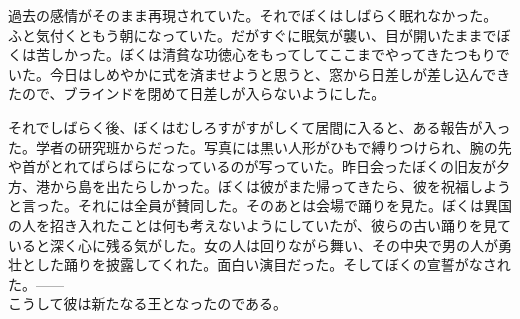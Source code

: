 \documentclass[b5j,twoside,twocolumn]{utarticle}
\begin{document}
過去の感情がそのまま再現されていた。それでぼくはしばらく眠れなかった。\\



ふと気付くともう朝になっていた。だがすぐに眠気が襲い、目が開いたままでぼくは苦しかった。ぼくは清貧な功徳心をもってしてここまでやってきたつもりでいた。今日はしめやかに式を済ませようと思うと、窓から日差しが差し込んできたので、ブラインドを閉めて日差しが入らないようにした。


それでしばらく後、ぼくはむしろすがすがしくて居間に入ると、ある報告が入った。学者の研究班からだった。写真には黒い人形がひもで縛りつけられ、腕の先や首がとれてばらばらになっているのが写っていた。昨日会ったぼくの旧友が夕方、港から島を出たらしかった。ぼくは彼がまた帰ってきたら、彼を祝福しようと言った。それには全員が賛同した。そのあとは会場で踊りを見た。ぼくは異国の人を招き入れたことは何も考えないようにしていたが、彼らの古い踊りを見ていると深く心に残る気がした。女の人は回りながら舞い、その中央で男の人が勇壮とした踊りを披露してくれた。面白い演目だった。そしてぼくの宣誓がなされた。\tbaselineshift=2.5pt------\tbaselineshift=4.0pt\\


こうして彼は新たなる王となったのである。
\end{document}
